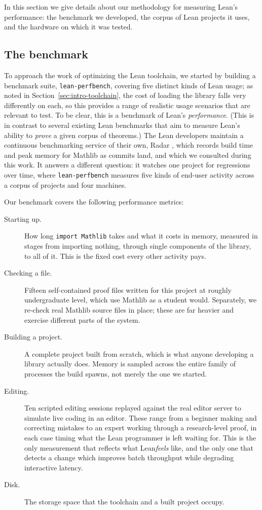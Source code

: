 \documentclass{article}
\newcommand{\Lean}{Lean\xspace}      %
\newcommand{\mathlib}{Mathlib\xspace}
\newcommand{\perfbench}{\texttt{lean-perfbench}\xspace}
\begin{document}
In this section we give details about our methodology for measuring \Lean's performance: the benchmark we developed, the corpus of \Lean projects it uses, and the hardware on which it was tested.

\subsection{The benchmark}

To approach the work of optimizing the \Lean toolchain, we started by building a benchmark suite, \perfbench, covering five distinct kinds of \Lean usage; as noted in Section~\ref{sec:intro-toolchain}, the cost of loading the library falls very differently on each, so this provides a range of realistic usage scenarios that are relevant to test. To be clear, this is a benchmark of \Lean's \emph{performance}. (This is in contrast to several existing \Lean benchmarks that aim to measure \Lean's ability to \emph{prove} a given corpus of theorems.) The \Lean developers maintain a continuous benchmarking service of their own, Radar \cite{radar}, which records build time and peak memory for \mathlib as commits land, and which we consulted during this work. It answers a different question: it watches one project for regressions over time, where \perfbench measures five kinds of end-user activity across a corpus of projects and four machines.

Our benchmark covers the following performance metrics:

\begin{description}
\item[Starting up.] How long \texttt{import Mathlib} takes and what it costs in memory, measured in stages from importing nothing, through single components of the library, to all of it. This is the fixed cost every other activity pays.
\item[Checking a file.] Fifteen self-contained proof files written for this project at roughly undergraduate level, which use \mathlib as a student would. Separately, we re-check real \mathlib source files in place; these are far heavier and exercise different parts of the system.
\item[Building a project.] A complete project built from scratch, which is what anyone developing a library actually does. Memory is sampled across the entire family of processes the build spawns, not merely the one we started.
\item[Editing.] Ten scripted editing sessions replayed against the real editor server to simulate live coding in an editor. These range from a beginner making and correcting mistakes to an expert working through a research-level proof, in each case timing what the \Lean programmer is left waiting for. This is the only measurement that reflects what \Lean \emph{feels} like, and the only one that detects a change which improves batch throughput while degrading interactive latency.
\item[Disk.] The storage space that the toolchain and a built project occupy.
\end{description}
\end{document}
